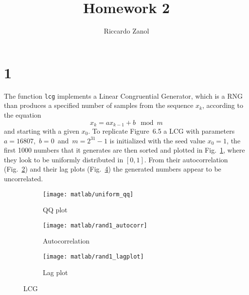 \documentclass[a4paper,oneside]{article}
\author{Riccardo Zanol}
\title{Homework 2}
\newcommand{\inlinecode}[1]{\lstinline[basicstyle=\ttfamily,keywordstyle={},stringstyle={},commentstyle={\itshape}]{#1}}
\begin{document}
\maketitle
\section*{1}
The function \inlinecode{lcg} implements a Linear Congruential
Generator, which is a RNG than produces a specified number of samples
from the sequence $x_k$, according to the equation
\[ x_{k} = ax_{k-1} +b \mod m  \]
and starting with a given $x_0$.  To replicate Figure~6.5 a LCG with
parameters $a=16807$,~$b=0$~and~$m=2^{31}-1$ is initialized with the
seed value $x_0 = 1$, the first 1000 numbers that it generates are
then sorted and plotted in Fig.~\ref{plot:qqplot}, where they look to
be uniformly distributed in $[0,1]$.  From their autocorrelation
(Fig.~\ref{plot:autocorr}) and their lag plots
(Fig.~\ref{plot:lagplot}) the generated numbers appear to be
uncorrelated.
\begin{figure}[htbp]
  \centering
  \begin{subfigure}{0.5\textwidth}
    \centering
    \texttt{[image: matlab/uniform\_qq]}
    \caption{QQ plot}
    \label{plot:qqplot}
  \end{subfigure}%
  \begin{subfigure}{0.5\textwidth}
        \centering
    \texttt{[image: matlab/rand1\_autocorr]}
    \caption{Autocorrelation}
    \label{plot:autocorr}
  \end{subfigure}
  \begin{subfigure}{0.75\textwidth}
        \centering
    \texttt{[image: matlab/rand1\_lagplot]}
    \caption{Lag plot}
    \label{plot:lagplot}
  \end{subfigure}
  \caption{LCG}
\end{figure}
\end{document}
